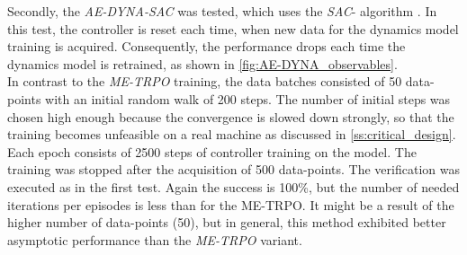 \documentclass[
reprint,
amsmath,amssymb,amsfonts,clevref,
aps,
prstab,
]{revtex4-2}
\begin{document}
	Secondly, the \emph{AE-DYNA-SAC} was tested, which uses the \emph{SAC}- algorithm \cite{Haarnoja2018a}. In this test, the controller is reset each time, when new data for the dynamics model training is acquired. Consequently, the performance drops each time the dynamics model is retrained, as shown in \cref{fig:AE-DYNA_observables}.\\
	In contrast to the \emph{ME-TRPO} training, the data batches consisted of 50 data-points with an initial random walk of 200 steps. The number of initial steps was chosen high enough because the convergence is slowed down strongly, so that the training becomes unfeasible on a real machine as discussed in \cref{ss:critical_design}. Each epoch consists of 2500 steps of controller training on the model. The training was stopped after the acquisition of 500 data-points. The verification was executed as in the first test. Again the success is 100\%, but the number of needed iterations per episodes is less than for the ME-TRPO. It might be a result of the higher number of data-points (50), but in general, this method exhibited better asymptotic performance than the \emph{ME-TRPO} variant.
\end{document}
